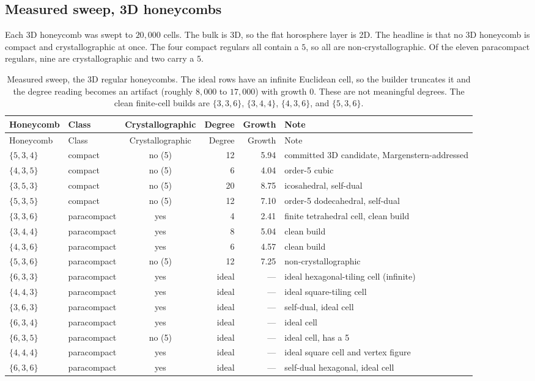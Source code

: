 \subsection{Measured sweep, 3D honeycombs}

Each 3D honeycomb was swept to $20{,}000$ cells. The bulk is 3D, so the flat horosphere layer is 2D. The headline
is that no 3D honeycomb is compact and crystallographic at once. The four compact regulars all contain a $5$, so
all are non-crystallographic. Of the eleven paracompact regulars, nine are crystallographic and two carry a $5$.

{\small
\begin{longtable}{l l c r r p{2.4in}}
\caption{Measured sweep, the 3D regular honeycombs. The ideal rows have an infinite Euclidean cell, so the
builder truncates it and the degree reading becomes an artifact (roughly $8{,}000$ to $17{,}000$) with growth $0$.
These are not meaningful degrees. The clean finite-cell builds are $\{3,3,6\}$, $\{3,4,4\}$, $\{4,3,6\}$, and
$\{5,3,6\}$.}
\label{tab:sweep-3d}\\
\toprule
Honeycomb & Class & Crystallographic & Degree & Growth & Note \\
\midrule
\endfirsthead
\toprule
Honeycomb & Class & Crystallographic & Degree & Growth & Note \\
\midrule
\endhead
\bottomrule
\endfoot
$\{5,3,4\}$ & compact & no (5) & 12 & 5.94 & committed 3D candidate, Margenstern-addressed \\
$\{4,3,5\}$ & compact & no (5) & 6 & 4.04 & order-5 cubic \\
$\{3,5,3\}$ & compact & no (5) & 20 & 8.75 & icosahedral, self-dual \\
$\{5,3,5\}$ & compact & no (5) & 12 & 7.10 & order-5 dodecahedral, self-dual \\
$\{3,3,6\}$ & paracompact & yes & 4 & 2.41 & finite tetrahedral cell, clean build \\
$\{3,4,4\}$ & paracompact & yes & 8 & 5.04 & clean build \\
$\{4,3,6\}$ & paracompact & yes & 6 & 4.57 & clean build \\
$\{5,3,6\}$ & paracompact & no (5) & 12 & 7.25 & non-crystallographic \\
$\{6,3,3\}$ & paracompact & yes & ideal & --- & ideal hexagonal-tiling cell (infinite) \\
$\{4,4,3\}$ & paracompact & yes & ideal & --- & ideal square-tiling cell \\
$\{3,6,3\}$ & paracompact & yes & ideal & --- & self-dual, ideal cell \\
$\{6,3,4\}$ & paracompact & yes & ideal & --- & ideal cell \\
$\{6,3,5\}$ & paracompact & no (5) & ideal & --- & ideal cell, has a 5 \\
$\{4,4,4\}$ & paracompact & yes & ideal & --- & ideal square cell and vertex figure \\
$\{6,3,6\}$ & paracompact & yes & ideal & --- & self-dual hexagonal, ideal cell \\
\end{longtable}}


